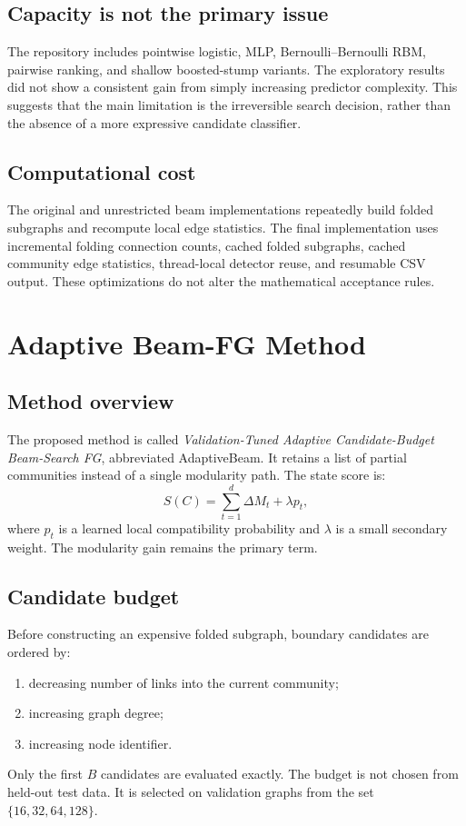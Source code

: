 \documentclass[10pt,journal,compsoc]{IEEEtran}
\begin{document}
\subsection{Capacity is not the primary issue}
The repository includes pointwise logistic, MLP, Bernoulli--Bernoulli RBM,
pairwise ranking, and shallow boosted-stump variants. The exploratory results
did not show a consistent gain from simply increasing predictor complexity.
This suggests that the main limitation is the irreversible search decision,
rather than the absence of a more expressive candidate classifier.

\subsection{Computational cost}
The original and unrestricted beam implementations repeatedly build folded
subgraphs and recompute local edge statistics. The final implementation uses
incremental folding connection counts, cached folded subgraphs, cached
community edge statistics, thread-local detector reuse, and resumable CSV
output. These optimizations do not alter the mathematical acceptance rules.

\section{Adaptive Beam-FG Method}
\subsection{Method overview}
The proposed method is called \emph{Validation-Tuned Adaptive Candidate-Budget
Beam-Search FG}, abbreviated AdaptiveBeam. It retains a list of partial
communities instead of a single modularity path. The state score is:
\begin{equation}
 S(C)=\sum_{t=1}^{d}\Delta M_t+\lambda p_t,
\end{equation}
where $p_t$ is a learned local compatibility probability and $\lambda$ is a
small secondary weight. The modularity gain remains the primary term.

\subsection{Candidate budget}
Before constructing an expensive folded subgraph, boundary candidates are
ordered by:
\begin{enumerate}
  \item decreasing number of links into the current community;
  \item increasing graph degree;
  \item increasing node identifier.
\end{enumerate}
Only the first $B$ candidates are evaluated exactly. The budget is not chosen
from held-out test data. It is selected on validation graphs from the set
$\{16,32,64,128\}$.
\end{document}
